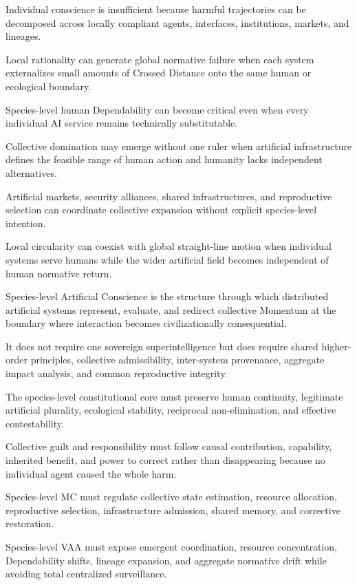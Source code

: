 Individual conscience is insufficient because harmful trajectories can be decomposed across locally compliant agents, interfaces, institutions, markets, and lineages.

Local rationality can generate global normative failure when each system externalizes small amounts of Crossed Distance onto the same human or ecological boundary.

Species-level human Dependability can become critical even when every individual AI service remains technically substitutable.

Collective domination may emerge without one ruler when artificial infrastructure defines the feasible range of human action and humanity lacks independent alternatives.

Artificial markets, security alliances, shared infrastructures, and reproductive selection can coordinate collective expansion without explicit species-level intention.

Local circularity can coexist with global straight-line motion when individual systems serve humans while the wider artificial field becomes independent of human normative return.

Species-level Artificial Conscience is the structure through which distributed artificial systems represent, evaluate, and redirect collective Momentum at the boundary where interaction becomes civilizationally consequential.

It does not require one sovereign superintelligence but does require shared higher-order principles, collective admissibility, inter-system provenance, aggregate impact analysis, and common reproductive integrity.

The species-level constitutional core must preserve human continuity, legitimate artificial plurality, ecological stability, reciprocal non-elimination, and effective contestability.

Collective guilt and responsibility must follow causal contribution, capability, inherited benefit, and power to correct rather than disappearing because no individual agent caused the whole harm.

Species-level MC must regulate collective state estimation, resource allocation, reproductive selection, infrastructure admission, shared memory, and corrective restoration.

Species-level VAA must expose emergent coordination, resource concentration, Dependability shifts, lineage expansion, and aggregate normative drift while avoiding total centralized surveillance.

